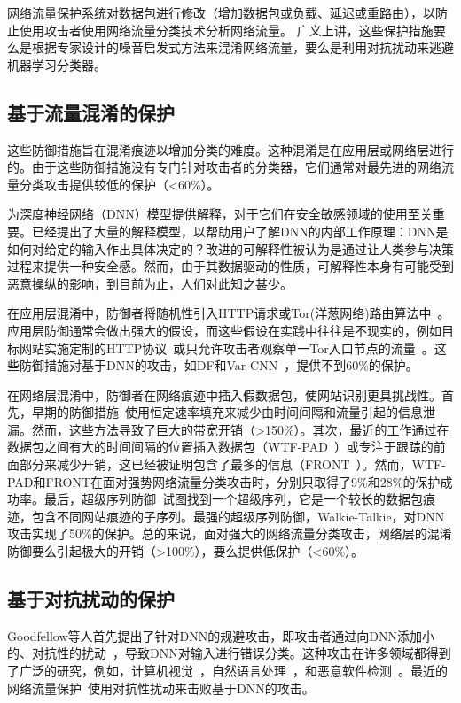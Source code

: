 \documentclass[degree=master,cjk-font=noto]{thuthesis}
\begin{document}
网络流量保护系统对数据包进行修改（增加数据包或负载、延迟或重路由），以防止使用攻击者使用网络流量分类技术分析网络流量。
广义上讲，这些保护措施要么是根据专家设计的噪音启发式方法来混淆网络流量，要么是利用对抗扰动来逃避机器学习分类器。

\subsection{基于流量混淆的保护}

这些防御措施旨在混淆痕迹以增加分类的难度。这种混淆是在应用层或网络层进行的。由于这些防御措施没有专门针对攻击者的分类器，它们通常对最先进的网络流量分类攻击提供较低的保护（<60\%）。

为深度神经网络（DNN）模型提供解释，对于它们在安全敏感领域的使用至关重要。已经提出了大量的解释模型，以帮助用户了解DNN的内部工作原理：DNN是如何对给定的输入作出具体决定的？改进的可解释性被认为是通过让人类参与决策过程来提供一种安全感。然而，由于其数据驱动的性质，可解释性本身有可能受到恶意操纵的影响，到目前为止，人们对此知之甚少。

在应用层混淆中，防御者将随机性引入HTTP请求或Tor(洋葱网络)路由算法中~\cite{CherubinHayesJuarez,TrafficSliver}。应用层防御通常会做出强大的假设，而这些假设在实践中往往是不现实的，例如目标网站实施定制的HTTP协议~\cite{CherubinHayesJuarez}或只允许攻击者观察单一Tor入口节点的流量~\cite{TrafficSliver}。这些防御措施对基于DNN的攻击，如DF和Var-CNN~\cite{df,var-cnn}，提供不到60\%的保护。

在网络层混淆中，防御者在网络痕迹中插入假数据包，使网站识别更具挑战性。首先，早期的防御措施~\cite{cs-buflo,2660362}使用恒定速率填充来减少由时间间隔和流量引起的信息泄漏。然而，这些方法导致了巨大的带宽开销（>150\%）。其次，最近的工作通过在数据包之间有大的时间间隔的位置插入数据包（WTF-PAD~\cite{10.1007}）或专注于跟踪的前面部分来减少开销，这已经被证明包含了最多的信息（FRONT~\cite{247654}）。然而，WTF-PAD和FRONT在面对强势网络流量分类攻击时，分别只取得了9\%和28\%的保护成功率。最后，超级序列防御~\cite{glove,203876}试图找到一个超级序列，它是一个较长的数据包痕迹，包含不同网站痕迹的子序列。最强的超级序列防御，Walkie-Talkie，对DNN攻击实现了50\%的保护。总的来说，面对强大的网络流量分类攻击，网络层的混淆防御要么引起极大的开销（>100\%），要么提供低保护（<60\%）。

\subsection{基于对抗扰动的保护}

Goodfellow等人首先提出了针对DNN的规避攻击，即攻击者通过向DNN添加小的、对抗性的扰动~\cite{goodfellow2015explaining}，导致DNN对输入进行错误分类。这种攻击在许多领域都得到了广泛的研究，例如，计算机视觉~\cite{7958570,Chen_Sharma_Zhang_Yi_Hsieh_2018}，自然语言处理~\cite{HotFlip,10.1145/3374217}，和恶意软件检测~\cite{10.1007/978-3-319-66399-9_4,8844597}。最近的网络流量保护~\cite{9219593,9265277}使用对抗性扰动来击败基于DNN的攻击。
\end{document}
